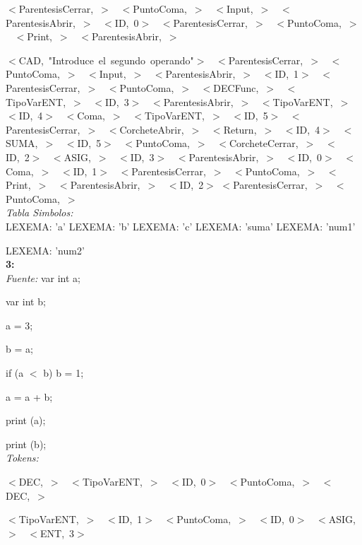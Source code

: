 \documentclass[a4paper, 12pt]{article}
\begin{document}
 \noindent
 \mbox{$<$ParentesisCerrar, $>$ }
 \mbox{$<$PuntoComa, $>$ }
 \mbox{$<$Input, $>$ }
 \mbox{$<$ParentesisAbrir, $>$ }
 \mbox{$<$ID, 0$>$ }
 \mbox{$<$ParentesisCerrar, $>$ }
 \mbox{$<$PuntoComa, $>$ }
 \mbox{$<$Print, $>$ }
 \mbox{$<$ParentesisAbrir, $>$ }
 
 \noindent
 \mbox{$<$CAD, \textnormal{"Introduce el segundo operando"}$>$ }
 \mbox{$<$ParentesisCerrar, $>$ }
 \mbox{$<$PuntoComa, $>$ }
 \mbox{$<$Input, $>$ }
 \mbox{$<$ParentesisAbrir, $>$ }
 \mbox{$<$ID, 1$>$ }
 \mbox{$<$ParentesisCerrar, $>$ }
 \mbox{$<$PuntoComa, $>$ }
 \mbox{$<$DECFunc, $>$ }
 \mbox{$<$TipoVarENT, $>$ }
 \mbox{$<$ID, 3$>$ }
 \mbox{$<$ParentesisAbrir, $>$ }
 \mbox{$<$TipoVarENT, $>$}
 \mbox{$<$ID, 4$>$ }
 \mbox{$<$Coma, $>$ }
 \mbox{$<$TipoVarENT, $>$ }
 \mbox{$<$ID, 5$>$ }
 \mbox{$<$ParentesisCerrar, $>$ }
 \mbox{$<$CorcheteAbrir, $>$ }
 \mbox{$<$Return, $>$ }
 \mbox{$<$ID, 4$>$ }
 \mbox{$<$SUMA, $>$ }
 \mbox{$<$ID, 5$>$ }
 \mbox{$<$PuntoComa, $>$ }
 \mbox{$<$CorcheteCerrar, $>$ }
 \mbox{$<$ID, 2$>$ }
 \mbox{$<$ASIG, $>$ }
 \mbox{$<$ID, 3$>$ }
 \mbox{$<$ParentesisAbrir, $>$ }
 \mbox{$<$ID, 0$>$ }
 \mbox{$<$Coma, $>$ }
 \mbox{$<$ID, 1$>$ }
 \mbox{$<$ParentesisCerrar, $>$ }
 \mbox{$<$PuntoComa, $>$ }
 \mbox{$<$Print, $>$ }
 \mbox{$<$ParentesisAbrir, $>$ }
 \mbox{$<$ID, 2$>$}
 \mbox{$<$ParentesisCerrar, $>$ }
 \mbox{$<$PuntoComa, $>$ }\medskip\\
\emph{Tabla Simbolos:}\\ 
  LEXEMA: 'a'
  LEXEMA: 'b'
  LEXEMA: 'c'
  LEXEMA: 'suma'
  LEXEMA: 'num1'
  
  \noindent
  LEXEMA: 'num2'\bigskip\\
 \textbf{3:}\medskip \\
 \emph{Fuente:}
var int a;

var int b;

a = 3;

b = a;

 if (a  $<$  b) b  =  1;
 
 a = a  +  b;
 
print (a);

print (b);
\medskip\\
\emph{Tokens:}

 \noindent
 \mbox{$<$DEC, $>$ }
 \mbox{$<$TipoVarENT, $>$ }
 \mbox{$<$ID, 0$>$ }
 \mbox{$<$PuntoComa, $>$ }
 \mbox{$<$DEC, $>$ }
 
 \noindent
 \mbox{$<$TipoVarENT, $>$ }
 \mbox{$<$ID, 1$>$ }
 \mbox{$<$PuntoComa, $>$ }
 \mbox{$<$ID, 0$>$ }
 \mbox{$<$ASIG, $>$ }
 \mbox{$<$ENT, 3$>$ }
 
\end{document}

